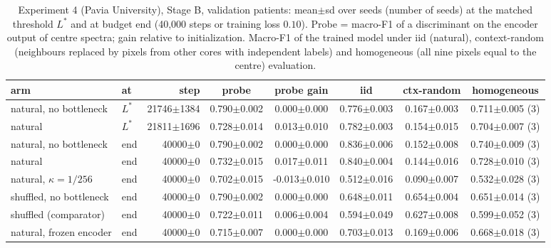 \begin{table}[htbp]\centering\scriptsize
\caption{Experiment 4 (Pavia University), Stage B, validation patients: mean$\pm$sd over seeds (number of seeds) at the matched threshold $L^\ast$ and at budget end (40{,}000 steps or training loss $0.10$). Probe = macro-F1 of a discriminant on the encoder output of centre spectra; gain relative to initialization. Macro-F1 of the trained model under iid (natural), context-random (neighbours replaced by pixels from other cores with independent labels) and homogeneous (all nine pixels equal to the centre) evaluation.}\label{tab:exp4_val_paviau}
\begin{tabular}{llrccccc}\toprule
arm & at & step & probe & probe gain & iid & ctx-random & homogeneous \\ \midrule
natural, no bottleneck & $L^\ast$ & 21746$\pm$1384 & 0.790$\pm$0.002 & 0.000$\pm$0.000 & 0.776$\pm$0.003 & 0.167$\pm$0.003 & 0.711$\pm$0.005 (3) \\
natural & $L^\ast$ & 21811$\pm$1696 & 0.728$\pm$0.014 & 0.013$\pm$0.010 & 0.782$\pm$0.003 & 0.154$\pm$0.015 & 0.704$\pm$0.007 (3) \\
\midrule
natural, no bottleneck & end & 40000$\pm$0 & 0.790$\pm$0.002 & 0.000$\pm$0.000 & 0.836$\pm$0.006 & 0.152$\pm$0.008 & 0.740$\pm$0.009 (3) \\
natural & end & 40000$\pm$0 & 0.732$\pm$0.015 & 0.017$\pm$0.011 & 0.840$\pm$0.004 & 0.144$\pm$0.016 & 0.728$\pm$0.010 (3) \\
natural, $\kappa=1/256$ & end & 40000$\pm$0 & 0.702$\pm$0.015 & -0.013$\pm$0.010 & 0.512$\pm$0.016 & 0.090$\pm$0.007 & 0.532$\pm$0.028 (3) \\
shuffled, no bottleneck & end & 40000$\pm$0 & 0.790$\pm$0.002 & 0.000$\pm$0.000 & 0.648$\pm$0.011 & 0.654$\pm$0.004 & 0.651$\pm$0.014 (3) \\
shuffled (comparator) & end & 40000$\pm$0 & 0.722$\pm$0.011 & 0.006$\pm$0.004 & 0.594$\pm$0.049 & 0.627$\pm$0.008 & 0.599$\pm$0.052 (3) \\
natural, frozen encoder & end & 40000$\pm$0 & 0.715$\pm$0.007 & 0.000$\pm$0.000 & 0.703$\pm$0.013 & 0.169$\pm$0.006 & 0.668$\pm$0.018 (3) \\
\bottomrule
\end{tabular}\end{table}
